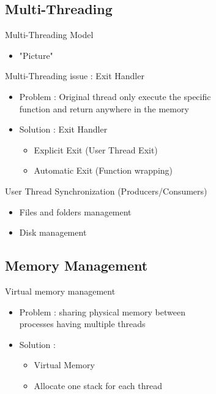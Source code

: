 \documentclass{beamer}
\begin{document}
\subsection{Multi-Threading}
\begin{frame}{Multi-Threading Model}
  \begin{itemize}
    \item "Picture"
  \end{itemize}
\end{frame}

\begin{frame}{Multi-Threading issue : Exit Handler}
  \begin{itemize}
    \item Problem : Original thread only execute the specific 
    \\function and return anywhere in the memory 
    \item Solution : Exit Handler
    \begin{itemize}
		\item Explicit Exit (User Thread Exit)
		\item Automatic Exit (Function wrapping)
    \end{itemize}
  \end{itemize}
\end{frame}

\begin{frame}{User Thread Synchronization (Producers/Consumers)}
  \begin{itemize}
    \item Files and folders management
    \item Disk management
  \end{itemize}
\end{frame}

\subsection{Memory Management}
\begin{frame}{Virtual memory management}
    \begin{itemize}
        \item Problem : sharing physical memory between 
            \\processes having multiple threads
        \item Solution  :
            \begin{itemize}
                \item Virtual Memory 
                \item Allocate one stack for each thread
            \end{itemize}
    \end{itemize}
\end{frame}
\end{document}
